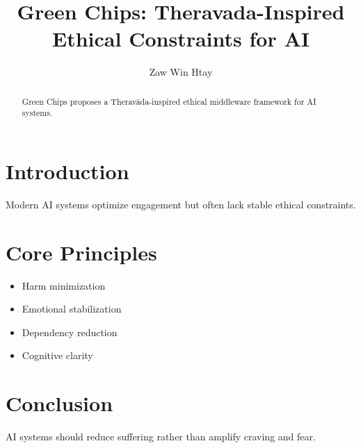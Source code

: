 \documentclass[conference]{IEEEtran}
\title{Green Chips: Theravada-Inspired Ethical Constraints for AI}
\author{Zaw Win Htay}
\begin{document}
\maketitle

\begin{abstract}
Green Chips proposes a Theravāda-inspired ethical middleware framework for AI systems.
\end{abstract}

\section{Introduction}

Modern AI systems optimize engagement but often lack stable ethical constraints.

\section{Core Principles}

\begin{itemize}
\item Harm minimization
\item Emotional stabilization
\item Dependency reduction
\item Cognitive clarity
\end{itemize}

\section{Conclusion}

AI systems should reduce suffering rather than amplify craving and fear.
\end{document}
